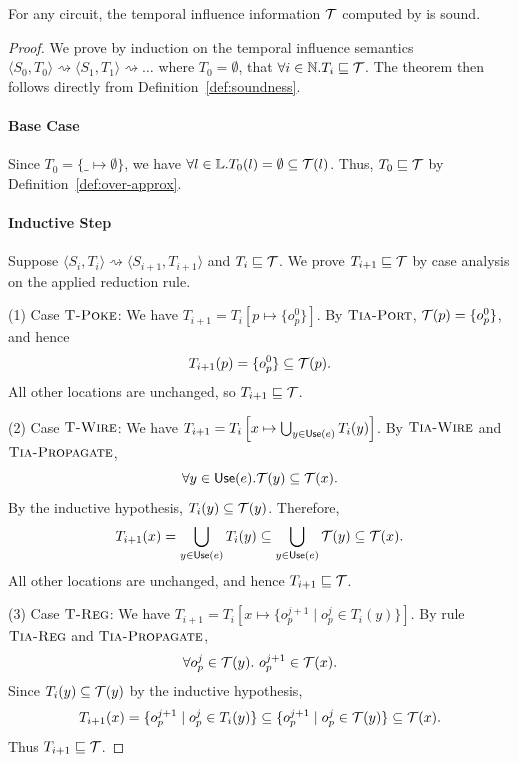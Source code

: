 \begin{theorem}\label{theo:soundness}
    For any circuit, the temporal influence information $\mathcal{T}$ computed by \tia is sound.
\end{theorem}
\begin{proof}
    We prove by induction on the temporal influence semantics
    $\langle S_0, T_0\rangle \rightsquigarrow \langle S_1, T_1\rangle \rightsquigarrow \dots$ where $T_0 = \emptyset$, that $\forall i \in \mathbb{N}. T_i \sqsubseteq \mathcal{T}$.
    The theorem then follows directly from Definition~\ref{def:soundness}.

    \paragraph{Base Case} Since $T_0 = \{\_ \mapsto \emptyset\}$, we have $\forall l \in \mathbb{L}. T_0(l) = \emptyset \subseteq \mathcal{T}(l)$.
    Thus, $T_0 \sqsubseteq \mathcal{T}$ by Definition~\ref{def:over-approx}.

    \paragraph{Inductive Step}
    Suppose $\langle S_i, T_i\rangle \rightsquigarrow \langle S_{i+1}, T_{i+1}\rangle$ and $T_i \sqsubseteq \mathcal{T}$.
    We prove $T_{i+1} \sqsubseteq \mathcal{T}$ by case analysis on the applied reduction rule.

    \vspace{1ex}
    \noindent
    (1) Case $\textsc{T-Poke}$:
    We have $T_{i+1} = T_i\left[p \mapsto \{o_p^0\}\right]$.
    By $\textsc{Tia-Port}$, $\mathcal{T}(p) = \{o_p^0\}$, and hence
    \[
    T_{i+1}(p) = \{o_p^0\} \subseteq \mathcal{T}(p).
    \]
    All other locations are unchanged, so $T_{i+1} \sqsubseteq \mathcal{T}$.

    \vspace{1ex}
    \noindent
    (2) Case $\textsc{T-Wire}$:
    We have $T_{i+1} = T_i\left[x \mapsto \bigcup_{y \in \mathsf{Use}(e)}T_i(y)\right]$.
    By $\textsc{Tia-Wire}$ and $\textsc{Tia-Propagate}$,
    \[
    \forall y \in \mathsf{Use}(e). \mathcal{T}(y) \subseteq \mathcal{T}(x).
    \]
    By the inductive hypothesis, $T_i(y)\subseteq\mathcal{T}(y)$.
    Therefore,
    \[
    T_{i+1}(x) = \bigcup_{y \in \mathsf{Use}(e)}T_i(y) \subseteq \bigcup_{y \in \mathsf{Use}(e)}\mathcal{T}(y) \subseteq \mathcal{T}(x).
    \]
    All other locations are unchanged, and hence $T_{i+1} \sqsubseteq \mathcal{T}$.

    \vspace{1ex}
    \noindent
    (3) Case $\textsc{T-Reg}$:
    We have $T_{i+1} = T_i\left[x \mapsto \{o_p^{j+1} \mid o_p^{j} \in T_i(y)\}\right]$.
    By rule $\textsc{Tia-Reg}$ and $\textsc{Tia-Propagate}$,
    \[
    \forall o_p^j \in \mathcal{T}(y).\ o_p^{j+1} \in \mathcal{T}(x).
    \]
    Since $T_i(y) \subseteq \mathcal{T}(y)$ by the inductive hypothesis,
    \[
    T_{i+1}(x) = \{o_p^{j+1} \mid o_p^{j} \in T_i(y)\} \subseteq \{o_p^{j+1} \mid o_p^{j} \in \mathcal{T}(y)\} \subseteq \mathcal{T}(x).
    \]
    Thus $T_{i+1} \sqsubseteq \mathcal{T}$.


\end{proof}
